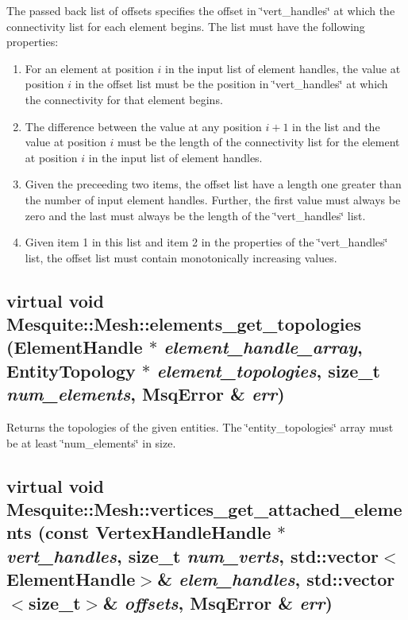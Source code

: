 The passed back list of offsets specifies the offset in \char`\"{}vert\_\-handles\char`\"{} at which the connectivity list for
each element begins.  The list must have the following properties:
\begin{enumerate}
\item For an element at position $i$ in the input list of element handles, the value at position $i$ in the offset list
must be the position in \char`\"{}vert\_\-handles\char`\"{} at which the connectivity for that element begins.
\item The difference between the value at any position $i+1$ in the list and the value at position $i$ must be the length
of the connectivity list for the element at position $i$ in the input list of element handles.
\item Given the preceeding two items, the offset list have a length one greater than the number of input element handles.  
Further, the first value must always be zero and the last must always be the length of the \char`\"{}vert\_\-handles\char`\"{} list.
\item Given item 1 in this list and item 2 in the properties of the \char`\"{}vert\_\-handles\char`\"{} list, the
offset list must contain monotonically increasing values.
\end{enumerate}

\subsection{\setlength{\rightskip}{0pt plus 5cm}virtual void Mesquite::Mesh::elements\_\-get\_\-topologies (Element\-Handle $\ast$ {\em element\_\-handle\_\-array}, Entity\-Topology $\ast$ {\em element\_\-topologies}, size\_\-t {\em num\_\-elements}, {\bf Msq\-Error} \& {\em err})\hspace{0.3cm}{\tt  [pure virtual]}}\label{classMesquite_1_1Mesh_a21}


Returns the topologies of the given entities. The \char`\"{}entity\_\-topologies\char`\"{} array must be at least \char`\"{}num\_\-elements\char`\"{} in size. 

\subsection{\setlength{\rightskip}{0pt plus 5cm}virtual void Mesquite::Mesh::vertices\_\-get\_\-attached\_\-elements (const VertexHandle\-Handle $\ast$ {\em vert\_\-handles}, size\_\-t {\em num\_\-verts}, std::vector$<$ElementHandle$>$\& {\em elem\_handles}, std::vector$<$size\_t$>$\& {\em offsets}, {\bf Msq\-Error} \& {\em err})\hspace{0.3cm}{\tt  [pure virtual]}}\label{classMesquite_1_1Mesh_a18}

